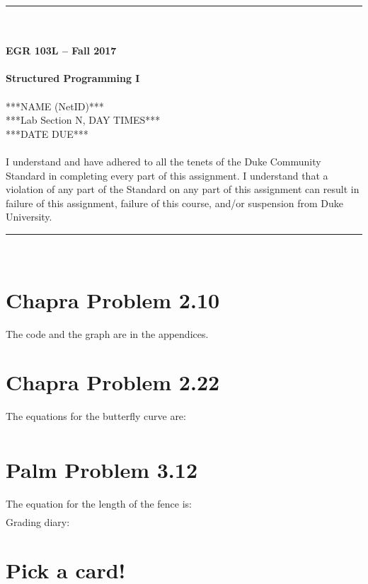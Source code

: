 \documentclass{article}
\begin{document}
\begin{center}
\rule{6.5in}{0.5mm}\\~\\
\textbf{\large EGR 103L -- Fall 2017}\\~\\
\textbf{\huge Structured Programming I}\\~\\
***NAME (NetID)***\\
***Lab Section N, DAY TIMES***\\
***DATE DUE***\\~\\
{\small I understand and have adhered to all the tenets of the Duke
  Community Standard in completing every part of this assignment.  I
  understand that a violation of any part of the Standard on any part
  of this assignment can result in failure of this assignment, failure
  of this course, and/or suspension from Duke University.} 
\rule{6.5in}{0.5mm}\\
\end{center}
\tableofcontents
\listoffigures
\pagebreak

\section{Chapra Problem 2.10}
The code and the graph are in the appendices.

\section{Chapra Problem 2.22}
The equations for the butterfly curve\cite[p.~52]{Chapra} are:
\begin{align*}
\end{align*}

\section{Palm Problem 3.12}
The equation for the length of the fence is:
\begin{align*}
\end{align*}
Grading diary:

\section{Pick a card!}
\end{document}
